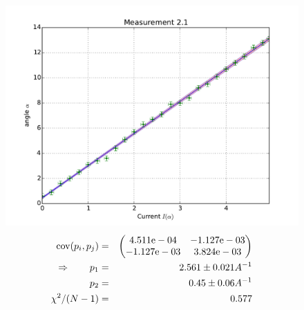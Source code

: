 \begin{figure}
    \begin{centering}
        \includegraphics[width=18cm]{figures/fig21}
\captionsetup{singlelinecheck=off} 
\caption[.]{
\begin{eqnarray*}
    \mathrm{cov}(p_i, p_j) &=& 
    \begin{pmatrix}
        4.511\mathrm{e}-04 &-1.127\mathrm{e}-03 \\
        -1.127\mathrm{e}-03 &3.824\mathrm{e}-03 \\
    \end{pmatrix}
\\ \Rightarrow \qquad
    p_1 &=& 2.561 \pm 0.021 A^{-1}\\
    p_2 &=& 0.45 \pm 0.06 A^{-1} \\ 
    \chi ^2/(N-1) &=&  0.577
\end{eqnarray*}
}

    \end{centering}
\end{figure}
